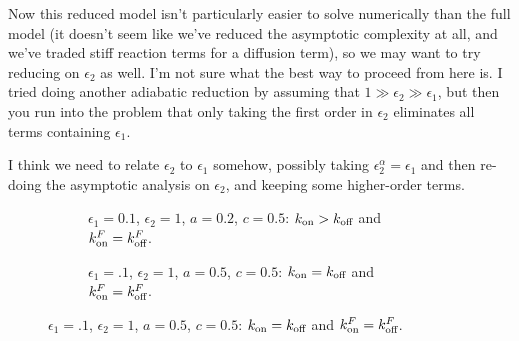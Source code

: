 \documentclass{article}
\newcommand{\tn}{\textnormal}
\begin{document}
Now this reduced model isn't particularly easier to solve numerically
than the full model (it doesn't seem like we've reduced the asymptotic
complexity at all, and we've traded stiff reaction terms for a
diffusion term), so we may want to try reducing on $\epsilon_2$ as
well. I'm not sure what the best way to proceed from here is. I tried
doing another adiabatic reduction by assuming that $1 \gg \epsilon_2
\gg \epsilon_1$, but then you run into the problem that only taking
the first order in $\epsilon_2$ eliminates all terms containing
$\epsilon_1$.

I think we need to relate $\epsilon_2$ to $\epsilon_1$ somehow,
possibly taking $\epsilon_2^\alpha = \epsilon_1$ and then re-doing the
asymptotic analysis on $\epsilon_2$, and keeping some higher-order terms.

\begin{figure}
  \centering
  \begin{subfigure}{0.48\textwidth}
    \caption{$\epsilon_1 = 0.1$, $\epsilon_2 = 1$, $a = 0.2$,
      $c = 0.5$: $k_\tn{on} > k_\tn{off}$ and
      $k_\tn{on}^F = k_\tn{off}^F$.}
  \end{subfigure}
  \hfill
  \begin{subfigure}{0.48\textwidth}
    \caption{$\epsilon_1 = .1$, $\epsilon_2 = 1$, $a = 0.5$,
      $c = 0.5$: $k_\tn{on} = k_\tn{off}$ and
      $k_\tn{on}^F = k_\tn{off}^F$.}
  \end{subfigure}

\end{figure}
\end{document}
